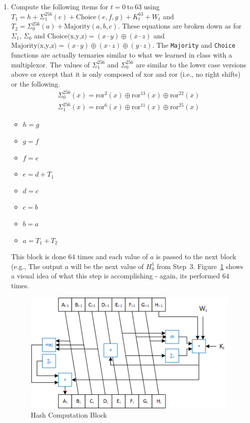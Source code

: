\documentclass{article}
\begin{document}
\begin{enumerate}
    \item Compute the following items for $t = 0~\text{to}~63$ using      
      $T_1 = h + \Sigma_1^{256} (e) + \text{Choice}(e,f,g) + K_t^{63} + W_t$ and
      $T_2 = \Sigma_0^{256} (a) + \text{Majority}(a,b,c)$.  These 
      equations are broken down as for $\Sigma_1$, $\Sigma_0$
      and $\text{Choice(x,y,z)} = (x \cdot y) \oplus (\overline{x} \cdot z)$ and
      $\text{Majority(x,y,z)} = (x \cdot y) \oplus (x \cdot z) \oplus (y
      \cdot z)$.  The \verb!Majority! and \verb!Choice! functions are
      actually ternaries similar to what we learned in class with a
      multiplexor.
      The values of $\Sigma_1^{256}$ and $\Sigma_0^{256}$
      are similar to the lower case versions above or except that it
      is only composed of xor and ror (i.e., no right shifts) or the following.
      \begin{eqnarray*}
        \Sigma_0^{256}(x) = \text{ror}^{2}(x) \oplus \text{ror}^{13}(x) \oplus \text{ror}^{22}(x)    \\
        \Sigma_1^{256}(x) = \text{ror}^{6}(x) \oplus \text{ror}^{11}(x) \oplus \text{ror}^{25}(x)    
      \end{eqnarray*}
  \begin{itemize}
  \item $h = g$
  \item $g = f$
  \item $f = e$
  \item $e = d + T_1$
  \item $d = c$
  \item $c = b$
  \item $b = a$
  \item $a = T_1 + T_2$
  \end{itemize}
  This block is done $64$ times and each value of $a$ is passed to the
  next block (e.g., The output $a$ will be the next value of $H_0^1$
  from Step~$3$.  Figure~\ref{sha256compression.fig} shows a visual idea
  of what this step is accomplishing - again, its performed $64$
  times.
  \begin{figure}
  \centering
  \includegraphics[scale=0.85]{sha256compression.png}
  \caption{Hash Computation Block}
  \label{sha256compression.fig}
  \end{figure}
  

\end{enumerate}
\end{document}

